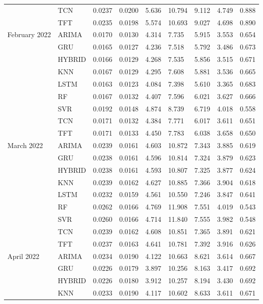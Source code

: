 \begin{tabular}{lllllllll}
 & TCN & 0.0237 & 0.0200 & 5.636 & 10.794 & 9.112 & 4.749 & 0.888 \\
 & TFT & 0.0235 & 0.0198 & 5.574 & 10.693 & 9.027 & 4.698 & 0.890 \\
February 2022 & ARIMA & 0.0170 & 0.0130 & 4.314 & 7.735 & 5.915 & 3.553 & 0.654 \\
 & GRU & 0.0165 & 0.0127 & 4.236 & 7.518 & 5.792 & 3.486 & 0.673 \\
 & HYBRID & 0.0166 & 0.0129 & 4.268 & 7.535 & 5.856 & 3.515 & 0.671 \\
 & KNN & 0.0167 & 0.0129 & 4.295 & 7.608 & 5.881 & 3.536 & 0.665 \\
 & LSTM & 0.0163 & 0.0123 & 4.084 & 7.398 & 5.610 & 3.365 & 0.683 \\
 & RF & 0.0167 & 0.0132 & 4.407 & 7.596 & 6.021 & 3.627 & 0.666 \\
 & SVR & 0.0192 & 0.0148 & 4.874 & 8.739 & 6.719 & 4.018 & 0.558 \\
 & TCN & 0.0171 & 0.0132 & 4.384 & 7.771 & 6.017 & 3.611 & 0.651 \\
 & TFT & 0.0171 & 0.0133 & 4.450 & 7.783 & 6.038 & 3.658 & 0.650 \\
March 2022 & ARIMA & 0.0239 & 0.0161 & 4.603 & 10.872 & 7.343 & 3.885 & 0.619 \\
 & GRU & 0.0238 & 0.0161 & 4.596 & 10.814 & 7.324 & 3.879 & 0.623 \\
 & HYBRID & 0.0238 & 0.0161 & 4.593 & 10.807 & 7.325 & 3.877 & 0.624 \\
 & KNN & 0.0239 & 0.0162 & 4.627 & 10.885 & 7.366 & 3.904 & 0.618 \\
 & LSTM & 0.0232 & 0.0159 & 4.561 & 10.550 & 7.246 & 3.847 & 0.641 \\
 & RF & 0.0262 & 0.0166 & 4.769 & 11.908 & 7.551 & 4.019 & 0.543 \\
 & SVR & 0.0260 & 0.0166 & 4.714 & 11.840 & 7.555 & 3.982 & 0.548 \\
 & TCN & 0.0239 & 0.0162 & 4.608 & 10.851 & 7.365 & 3.891 & 0.621 \\
 & TFT & 0.0237 & 0.0163 & 4.641 & 10.781 & 7.392 & 3.916 & 0.626 \\
April 2022 & ARIMA & 0.0234 & 0.0190 & 4.122 & 10.663 & 8.621 & 3.614 & 0.667 \\
 & GRU & 0.0226 & 0.0179 & 3.897 & 10.256 & 8.163 & 3.417 & 0.692 \\
 & HYBRID & 0.0226 & 0.0180 & 3.912 & 10.257 & 8.194 & 3.430 & 0.692 \\
 & KNN & 0.0233 & 0.0190 & 4.117 & 10.602 & 8.633 & 3.611 & 0.671 \\

\end{tabular}
